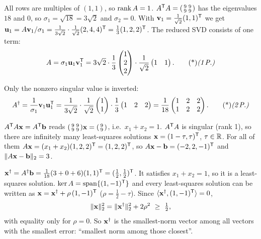 \begin{solution}
 All rows are multiples of $(1,1)$, so $\operatorname{rank} A=1$. 
$A^{\mathsf{T}} A=\begin{psmallmatrix}9&9\\9&9\end{psmallmatrix}$ has the eigenvalues $18$ and $0$, so $\sigma_1=\sqrt{18}=3\sqrt2$ and $\sigma_2=0$. With $\mathbf{v}_1=\frac1{\sqrt2}(1,1)^{\mathsf{T}}$ we get $\mathbf{u}_1=A\mathbf{v}_1/\sigma_1=\frac{1}{3\sqrt2}\cdot\frac{1}{\sqrt2}(2,4,4)^{\mathsf{T}}=\frac13(1,2,2)^{\mathsf{T}}$. 
The reduced SVD consists of one term:
\[
A=\sigma_1\vb u_1\vb v_1\T=3\sqrt2\cdot\frac13\begin{pmatrix}1\\2\\2\end{pmatrix}\cdot\frac1{\sqrt2}\begin{pmatrix}1&1\end{pmatrix}.\ptd{1}
\]

 Only the nonzero singular value is inverted:
\[
A^\dagger=\frac1{\sigma_1}\vb v_1\vb u_1\T=\frac1{3\sqrt2}\cdot\frac1{\sqrt2}\begin{pmatrix}1\\1\end{pmatrix}\cdot\frac13\begin{pmatrix}1&2&2\end{pmatrix}=\frac1{18}\begin{pmatrix}1&2&2\\1&2&2\end{pmatrix}.\ptd{2}
\]

 $A^{\mathsf{T}} A\mathbf{x}=A^{\mathsf{T}}\mathbf{b}$ reads $\begin{psmallmatrix}9&9\\9&9\end{psmallmatrix}\mathbf{x}=\begin{psmallmatrix}9\\9\end{psmallmatrix}$, i.e.\ $x_1+x_2=1$. 
$A^{\mathsf{T}} A$ is singular (rank 1), so there are infinitely many least-squares solutions $\mathbf{x}=(1-\tau,\tau)^{\mathsf{T}}$, $\tau\in\mathbb{R}$. For all of them $A\mathbf{x}=(x_1+x_2)(1,2,2)^{\mathsf{T}}=(1,2,2)^{\mathsf{T}}$, so $A\mathbf{x}-\mathbf{b}=(-2,2,-1)^{\mathsf{T}}$ and $\lVert A\mathbf{x}-\mathbf{b}\rVert_2=3$. 

 $\mathbf{x}^\dagger=A^\dagger\mathbf{b}=\frac1{18}(3+0+6)(1,1)^{\mathsf{T}}=(\frac12,\frac12)^{\mathsf{T}}$. It satisfies $x_1+x_2=1$, so it is a least-squares solution. 
$\ker A=\operatorname{span}\{(1,-1)^{\mathsf{T}}\}$ and every least-squares solution can be written as $\mathbf{x}=\mathbf{x}^\dagger+\rho\,(1,-1)^{\mathsf{T}}$ ($\rho=\frac12-\tau$). Since $\langle \mathbf{x}^\dagger,(1,-1)^{\mathsf{T}}\rangle=0$,
\[
\lVert \mathbf{x}\rVert_2^2=\lVert \mathbf{x}^\dagger\rVert_2^2+2\rho^2\ \ge\ \tfrac12,
\]
with equality only for $\rho=0$. So $\mathbf{x}^\dagger$ is the smallest-norm vector among all vectors with the smallest error: ``smallest norm among those closest''. 


\end{solution}
